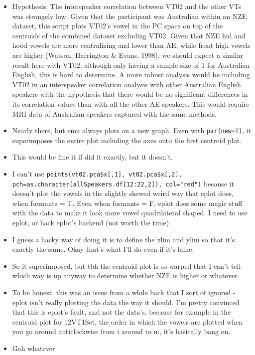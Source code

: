 \documentclass{article}
\begin{document}
\begin{itemize}
\begin{itemize}
        \item Hypothesis: The interspeaker correlation between VT02 and the other VTs was strangely low. Given that the participant was Australian within an NZE dataset, this script plots VT02's vowel in the PC space on top of the centroids of the combined dataset excluding VT02. Given that NZE hid and hood vowels are more centralizing and lower than AE, while front high vowels are higher (Watson, Harrington \& Evans, 1998), we should expect a similar result here with VT02, although only having a sample size of 1 for Australian English, this is hard to determine. A more robust analysis would be including VT02 in an interspeaker correlation analysis with other Australian English speakers with the hypothesis that there would be no significant differences in its correlation values than with all the other AE speakers. This would require MRI data of Australian speakers captured with the same methods.
        \item Nearly there, but emu always plots on a new graph. Even with \verb|par(new=T)|, it superimposes the entire plot including the axes onto the first centroid plot. 
        \item This would be fine it if did it exactly, but it doesn't.
        \item I can't use \verb|points(vt02.pca$x[,1], vt02.pca$x[,2], pch=as.character(allSpeakers.df[12:22,2]), col="red")| because it doesn't plot the vowels in the slightly skewed weird way that eplot does, when formants = T. Even when formants = F, eplot does some magic stuff with the data to make it look more vowel quadrilateral shaped. I need to use eplot, or hack eplot's backend (not worth the time)
        \item I guess a hacky way of doing it is to define the xlim and ylim so that it's exactly the same. Okay that's what I'll do even if it's lame.
        \item So it superimposed, but tbh the centroid plot is so warped that I can't tell which way is up anyway to determine whether NZE is higher or whatever.
        \item To be honest, this was an issue from a while back that I sort of ignored - eplot isn't really plotting the data the way it should. I'm pretty convinced that this is eplot's fault, and not the data's, because for example in the centroid plot for 12VT1Set, the order in which the vowels are plotted when you go around anticlockwise from i around to u:, it's basically bang on.
        \item Gah whatever
    \end{itemize}
\end{itemize}
\end{document}
